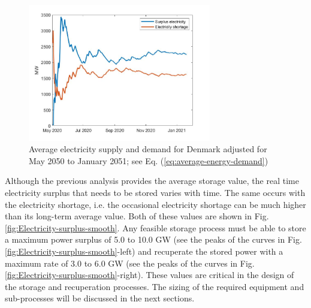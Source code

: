 \documentclass{ECOS_2021}
\begin{document}
\begin{figure}[H]
\centering
\includegraphics[width=8cm]{supply_demand_six_month_dk}

\caption{\label{fig:Average-electricity-supply}Average electricity supply
and demand for Denmark adjusted for May 2050 to January 2051; see
Eq. (\ref{eq:average-energy-demand})}
\end{figure}

Although the previous analysis provides the average storage value,
the real time electricity surplus that needs to be stored varies with
time. The same occurs with the electricity shortage, i.e. the occasional
electricity shortage can be much higher than its long-term average
value. Both of these values are shown in Fig. \ref{fig:Electricity-surplus-smooth}.
Any feasible storage process must be able to store a maximum power
surplus of 5.0 to 10.0 GW (see the peaks of the curves in Fig. \ref{fig:Electricity-surplus-smooth}-left)
and recuperate the stored power with a maximum rate of 3.0 to 6.0
GW (see the peaks of the curves in Fig. \ref{fig:Electricity-surplus-smooth}-right).
These values are critical in the design of the storage and recuperation
processes. The sizing of the required equipment and sub-processes
will be discussed in the next sections. 
\end{document}
